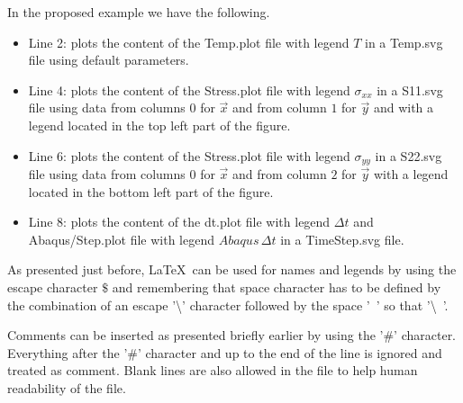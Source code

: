 In the proposed example we have the following.
\begin{itemize}
\item Line 2: plots the content of the Temp.plot file with legend $T$ in a Temp.svg file using default parameters.
\item Line 4: plots the content of the Stress.plot file with legend $\sigma_{xx}$ in a S11.svg file using data from columns $0$ for $\overrightarrow{x}$ and from column $1$ for $\overrightarrow{y}$ and with a legend located in the top left part of the figure.
\item Line 6: plots the content of the Stress.plot file with legend $\sigma_{yy}$ in a S22.svg file using data from columns $0$ for $\overrightarrow{x}$ and from column $2$ for $\overrightarrow{y}$ with a legend located in the bottom left part of the figure.
\item Line 8: plots the content of the dt.plot file with legend $\Delta t$ and Abaqus/Step.plot file with legend $Abaqus\,\Delta t$ in a TimeStep.svg file.
\end{itemize}

As presented just before, \LaTeX~can be used for names and legends by using the escape character $\$$ and remembering that space character has to be defined by the combination of an escape '\textbackslash' character followed by the space '~' so that '\textbackslash~'.

Comments can be inserted as presented briefly earlier by using the '\#' character. Everything after the '\#' character and up to the end of the line is ignored and treated as comment. Blank lines are also allowed in the file to help human readability of the file.


